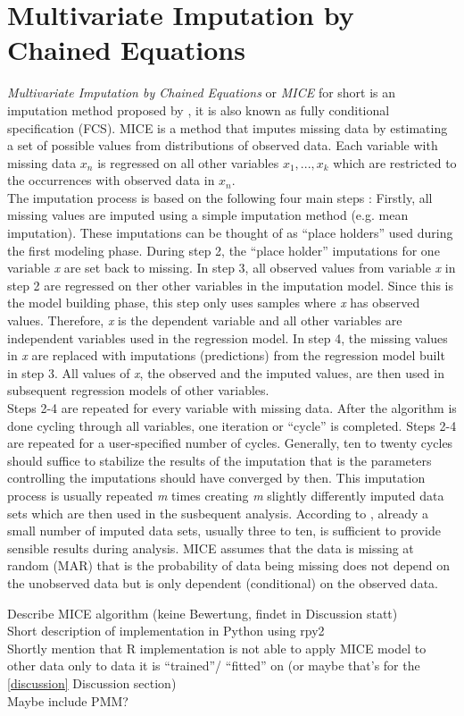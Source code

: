 \section{Multivariate Imputation by Chained Equations}
\textit{Multivariate Imputation by Chained Equations} or \textit{MICE} for 
short is an imputation method proposed by \citeauthor{RN135} \cite{RN135}, it 
is also known as fully conditional specification (FCS).
MICE is a method that imputes missing data by estimating a set of possible 
values from distributions of observed data. Each variable with missing data 
$x_n$ is regressed on all other variables $x_1, ..., x_k$ which are restricted 
to the occurrences with observed data in $x_n$.
\\
The imputation process is based on the following four main steps \cite{RN142, 
RN141}: Firstly, all missing values are imputed using a simple imputation 
method (e.g. mean imputation). These imputations can be thought of as ``place 
holders'' used during the first modeling phase. During step 2, the ``place 
holder'' imputations for one variable \textit{x} are set back to missing. In 
step 3, all observed values from variable \textit{x} in step 2 are regressed on 
ther other variables in the imputation model. Since this is the model building 
phase, this step only uses samples where \textit{x} has observed values. 
Therefore, \textit{x} is the dependent variable and all other variables are 
independent variables used in the regression model. In step 4, the missing 
values in \textit{x} are replaced with imputations (predictions) from the 
regression model built in step 3. All values of \textit{x}, the observed and the 
imputed values, are then used in subsequent regression models of other 
variables.
\\
Steps 2-4 are repeated for every variable with missing data. After the 
algorithm is done cycling through all variables, one iteration or ``cycle'' is 
completed. Steps 2-4 are repeated for a user-specified number of cycles. 
Generally, ten to twenty cycles should suffice to stabilize the results of the 
imputation that is the parameters controlling the imputations should have 
converged by then. This imputation process is usually repeated \textit{m} times 
creating \textit{m} slightly differently imputed data sets which are then used 
in the susbequent analysis. According to \cite{RN144, RN141, RN142}, already a 
small number of imputed data sets, usually three to ten, is sufficient to 
provide sensible results during analysis.
MICE assumes that the data is missing at random (MAR) that is the probability 
of data being missing does not depend on the unobserved data but is only 
dependent (conditional) on the observed data.
\begin{changemargin}{50pt}{50pt}
Describe MICE algorithm (keine Bewertung, findet in Discussion statt)
\\
Short description of implementation in Python using rpy2
\\
Shortly mention that R implementation is not able to apply MICE model to other 
data only to data it is ``trained''/ ``fitted'' on (or maybe that's for the 
\ref{discussion} Discussion section)
\\
Maybe include PMM?
\end{changemargin}
